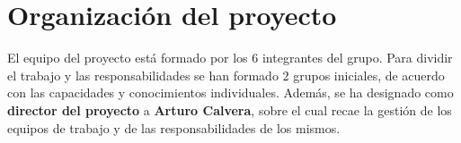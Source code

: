 \documentclass{article}
\begin{document}

\section{Organización del proyecto}

El equipo del proyecto está formado por los 6 integrantes del grupo. 
Para dividir el trabajo y las responsabilidades se han formado 2 grupos iniciales, 
de acuerdo con las capacidades y conocimientos individuales. 
Además, se ha designado como \textbf{director del proyecto} a \textbf{Arturo Calvera}, 
sobre el cual recae la gestión de los equipos de trabajo y de las responsabilidades de los mismos.
\end{document}
